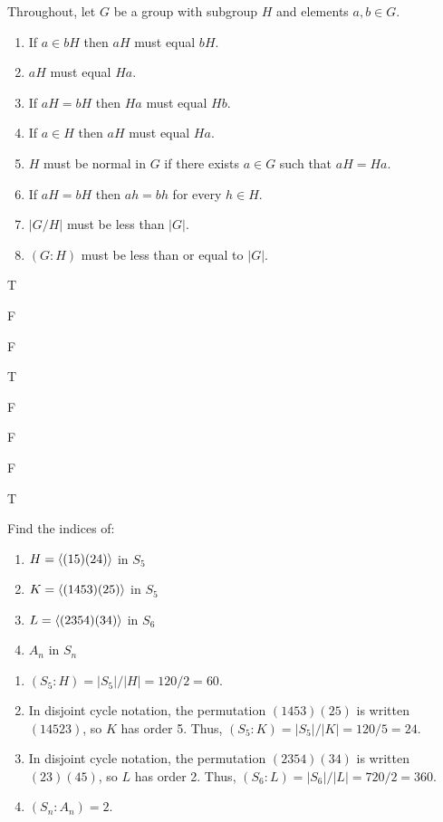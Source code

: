 \begin{exercise}
\tf Throughout, let $G$ be a group with subgroup $H$ and elements $a,b\in G$.

\begin{enumerate}
\item If $a\in bH$ then $aH$ must equal $bH$.
\item $aH$ must equal $Ha$.
\item If $aH=bH$ then $Ha$ must equal $Hb$.
\item If $a\in H$ then $aH$ must equal $Ha$.
\item $H$ must be normal in $G$ if there exists $a\in G$ such that $aH=Ha$.
\item If $aH=bH$ then $ah=bh$ for every $h\in H$.
\item $|G/H|$ must be less than $|G|$.
\item $(G:H)$ must be less than or equal to $|G|$.
\end{enumerate}
\end{exercise}

\begin{solution}[print=true]
\begin{inparaenum}[(a)]
\item T \hfill \item F \hfill \item F \hfill \item T \hfill \item F \hfill \item F \hfill \item F \hfill \item T
\end{inparaenum}
\end{solution}

\begin{exercise}
Find the indices of:

\begin{enumerate}\item $H=\langle(15)(24)\rangle$ in $S_5$
\item $K=\langle(1453)(25)\rangle$ in $S_5$
\item $L=\langle(2354)(34)\rangle$ in $S_6$
\item $A_n$ in $S_n$
\end{enumerate}
\end{exercise}


\begin{solution}[print=true]
 \begin{enumerate}\item $(S_5:H)=|S_5|/|H|=120/2=60.$
\item In disjoint cycle notation, the permutation $(1453)(25)$ is written $(14523)$, so $K$ has order 5. Thus, $(S_5:K)=|S_5|/|K|=120/5=24.$
\item In disjoint cycle notation, the permutation $(2354)(34)$ is written $(23)(45)$, so $L$ has order 2. Thus, $(S_6:L)=|S_6|/|L|=720/2=360.$
\item $(S_n:A_n)=2$.
\end{enumerate}
\end{solution}


